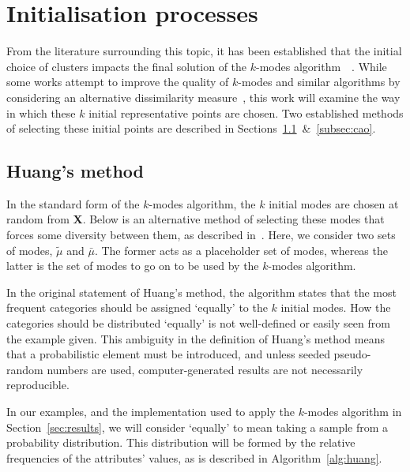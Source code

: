 \section{Initialisation processes}\label{sec:init}

From the literature surrounding this topic, it has been established that the 
initial choice of clusters impacts the final solution of the \(k\)-modes
algorithm~\cite{Huang1998}~\cite{Cao2009}. While some works attempt to improve
the quality of \(k\)-modes and similar algorithms by considering an alternative 
dissimilarity measure~\cite{Ng2007}, this work will examine the way in which
these \(k\) initial representative points are chosen. Two established methods of 
selecting these initial points are described in
Sections~\ref{subsec:huang}~\&~\ref{subsec:cao}.


\subsection{Huang's method}\label{subsec:huang}

In the standard form of the \(k\)-modes algorithm, the \(k\) initial modes are 
chosen at random from \textbf{X}. Below is an alternative method of selecting
these modes that forces some diversity between them, as described 
in~\cite{Huang1998}. Here, we consider two sets of modes, \(\tilde{\mu}\) and
\(\bar{\mu}\). The former acts as a placeholder set of modes, whereas the latter
is the set of modes to go on to be used by the \(k\)-modes algorithm.

\begin{singlespace}
    
\end{singlespace}

In the original statement of Huang's method, the algorithm states that the most
frequent categories should be assigned `equally' to the \(k\) initial modes. How
the categories should be distributed `equally' is not well-defined or easily
seen from the example given. This ambiguity in the definition of Huang's method
means that a probabilistic element must be introduced, and unless seeded
pseudo-random numbers are used, computer-generated results are not necessarily
reproducible.

In our examples, and the implementation used to apply the \(k\)-modes algorithm
in Section~\ref{sec:results}, we will consider `equally' to mean taking a sample
from a probability distribution. This distribution will be formed by the
relative frequencies of the attributes' values, as is described in
Algorithm~\ref{alg:huang}.


